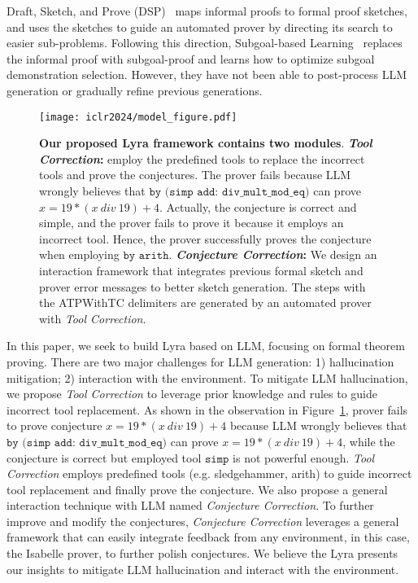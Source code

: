 \documentclass{article} \usepackage{iclr2024_conference,times}
\def\methodOneFull{\textit{Tool Correction}\xspace}
\def\methodTwoFull{\textit{Conjecture Correction}\xspace}
\def\fullname{Lyra\xspace}
\def\shortname{Lyra\xspace}
\begin{document}
Draft, Sketch, and Prove (DSP)~\citep{jiang2023draft} maps informal proofs to formal proof sketches, and uses the sketches to guide an automated prover by directing its search to easier sub-problems. Following this direction, Subgoal-based Learning~\citep{zhao2023decomposing} replaces the informal proof with subgoal-proof and learns how to optimize subgoal demonstration selection. However, they have not been able to post-process LLM generation or gradually refine previous generations.

\begin{figure}[ht]
\setlength{\abovecaptionskip}{0.1cm}
\texttt{[image: iclr2024/model\_figure.pdf]}
\caption{
\small
\textbf{Our proposed \shortname framework contains two modules}. \textbf{\methodOneFull:} employ the predefined tools to replace the incorrect tools and prove the conjectures. The prover fails because LLM wrongly believes that $\texttt{by\ (simp\ add:\ div\_mult\_mod\_eq)}$ can prove $x=19*(x~div~19)+4$. Actually, the conjecture is correct and simple, and the prover fails to prove it because it employs an incorrect tool. Hence, the prover successfully proves the conjecture when employing $\texttt{by~arith}$. \textbf{\methodTwoFull:} We design an interaction framework that integrates previous formal sketch and prover error messages to better sketch generation. The steps with the \textcolor{patriarch}{ATPWithTC} delimiters are generated by an automated prover with \methodOneFull.
}
\vspace{-21.5pt}
\label{fig: model figure}

\end{figure}
In this paper, we seek to build \fullname based on LLM, focusing on formal theorem proving. There are two major challenges for LLM generation: 1) hallucination mitigation; 2) interaction with the environment.  To mitigate LLM hallucination, we propose \methodOneFull to leverage prior knowledge and rules to guide incorrect tool replacement. As shown in the observation in Figure~\ref{fig: model figure}, prover fails to prove conjecture $x=19*(x~div~19)+4$ because LLM wrongly believes that $\texttt{by\ (simp\ add:\ div\_mult\_mod\_eq)}$ can prove $x=19*(x~div~19)+4$, while the conjecture is correct but employed tool $\texttt{simp}$ is not powerful enough. \methodOneFull employs predefined tools (e.g. sledgehammer, arith) to guide incorrect tool replacement and finally prove the conjecture. We also propose a general interaction technique with LLM named \methodTwoFull. To further improve and modify the conjectures, \methodTwoFull leverages a general framework that can easily integrate feedback from any environment, in this case, the Isabelle prover, to further polish conjectures. We believe the \shortname presents our insights to mitigate LLM hallucination and interact with the environment.
\end{document}
